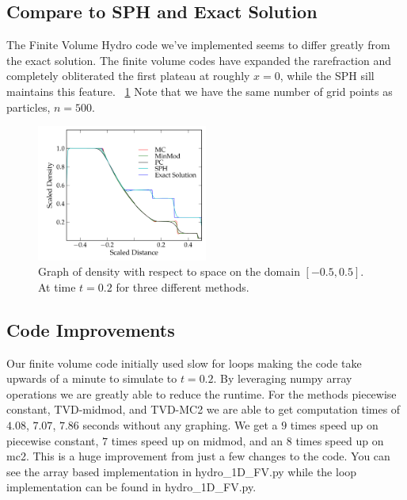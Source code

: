 \documentclass[11pt,letterpaper]{article}
\begin{document}
\subsection{Compare to SPH and Exact Solution}

The Finite Volume Hydro code we've implemented seems to differ greatly from the
exact solution. The finite volume codes have expanded the rarefraction and
completely obliterated the first plateau at roughly $x=0$, while the SPH sill 
maintains this feature. ~\ref{fig:compare} Note that we have the same number
of grid points as particles, $n = 500$.

\begin{figure}[bth]
\centering
\includegraphics[width=0.5\textwidth]{compare.pdf}
\caption{Graph of density with respect to space on the domain 
$[-0.5,0.5]$. At time $t = 0.2$ for three different methods.}
\label{fig:compare}
\end{figure}

\subsection{Code Improvements} 

Our finite volume code initially used slow for loops making the code take
upwards of a minute to simulate to $t = 0.2$. By leveraging numpy array
operations we are greatly able to reduce the runtime. For the methods 
piecewise constant, TVD-midmod, and TVD-MC2 we are able to get computation times
of $4.08$, $7.07$, $7.86$ seconds without any graphing. We get a $9$ times speed
up on piecewise constant, $7$ times speed up on midmod, and an $8$ times speed up
on mc2. This is a huge improvement from just a few changes to the code. You can
see the array based implementation in hydro\_1D\_FV.py while the loop 
implementation can be found in hydro\_1D\_FV.py.
\end{document}
